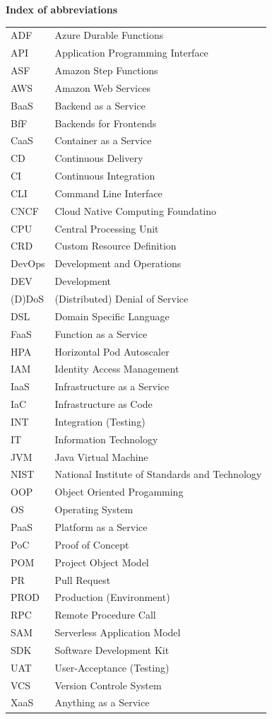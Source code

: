 \documentclass[a4paper,11pt, pagesize]{scrartcl}
\begin{document}
\begin{spacing}{1.2}
\newpage
{\Large \textbf {Index of abbreviations}}\\
\begin{spacing}{1.07}
\begin{tabular}{ p{2cm} p{10cm}} 
  ADF & Azure Durable Functions \\
  API & Application Programming Interface \\
  ASF & Amazon Step Functions \\
  AWS & Amazon Web Services \\
  BaaS & Backend as a Service \\
  BfF & Backends for Frontends \\
  CaaS & Container as a Service \\
  CD & Continuous Delivery \\
  CI & Continuous Integration \\
  CLI & Command Line Interface \\
  CNCF & Cloud Native Computing Foundatino \\
  CPU & Central Processing Unit \\
  CRD & Custom Resource Definition \\
  DevOps & Development and Operations \\
  DEV & Development \\
  (D)DoS & (Distributed) Denial of Service \\
  DSL & Domain Specific Language \\
  FaaS & Function as a Service \\
  HPA & Horizontal Pod Autoscaler \\
  IAM & Identity Access Management \\
  IaaS & Infrastructure as a Service \\
  IaC & Infrastructure as Code \\
  INT & Integration (Testing) \\
  IT & Information Technology \\
  JVM & Java Virtual Machine \\
  NIST & National Institute of Standards and Technology \\
  OOP & Object Oriented Progamming \\
  OS & Operating System \\
  PaaS & Platform as a Service \\
  PoC & Proof of Concept \\
  POM & Project Object Model \\
  PR & Pull Request \\
  PROD & Production (Environment) \\
  RPC & Remote Procedure Call \\
  SAM & Serverless Application Model \\
  SDK & Software Development Kit \\
  UAT & User-Acceptance (Testing) \\
  VCS & Version Controle System \\
  XaaS & Anything as a Service \\


\end{tabular}
\end{spacing}
\end{spacing}
\end{document}
